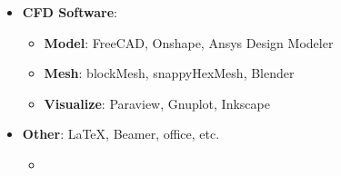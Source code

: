 {\begin{itemize}
    \item \textbf{CFD Software}:
      \begin{itemize}
        \item \textbf{Model}: FreeCAD, Onshape, Ansys Design Modeler
        \item \textbf{Mesh}: blockMesh, snappyHexMesh, Blender
        \item \textbf{Visualize}: Paraview, Gnuplot, Inkscape
      \end{itemize}
    \item \textbf{Other}: \LaTeX, Beamer, office, etc.
      \begin{itemize}
        \item {}
      \end{itemize}
    \shorthandon{:}
  \end{itemize}
}

